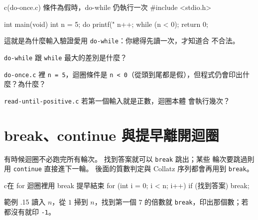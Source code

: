 \begin{example}{c}{(do-once.c) 條件為假時，do-while 仍執行一次}
#include <stdio.h>

int main(void) {
    int n = 5;
    do {
        printf("%
        n++;
    } while (n < 0);
    return 0;
}
\end{example}


這就是為什麼輸入驗證愛用 \texttt{do-while}：你總得先讀一次，才知道合
不合法。

\begin{drills}[label=drills:loop-do-while]
\item \texttt{do-while} 跟 \texttt{while} 最大的差別是什麼？
\item \texttt{do-once.c} 裡 \texttt{n = 5}，迴圈條件是
\texttt{n < 0}（從頭到尾都是假），但程式仍會印出什麼？為什麼？
\item \texttt{read-until-positive.c} 若第一個輸入就是正數，迴圈本體
會執行幾次？
\end{drills}

\section{break、continue 與提早離開迴圈}
\label{sec:loop-break-continue}

有時候迴圈不必跑完所有輪次。 找到答案就可以 \texttt{break} 跳出；某些
輪次要跳過則用 \texttt{continue} 直接進下一輪。 後面的質數判定與
Collatz 序列都會再用到 \texttt{break}。

\begin{code}{c}{在 for 迴圈裡用 break 提早結束}
for (int i = 0; i < n; i++) {
    if (找到答案) {
        break;
    }
}
\end{code}


範例 \thechapter.15 讀入 $n$，從 $1$ 掃到 $n$，找到第一個 $7$ 的倍數就
\texttt{break}，印出那個數；若都沒有就印 \texttt{-1}。


